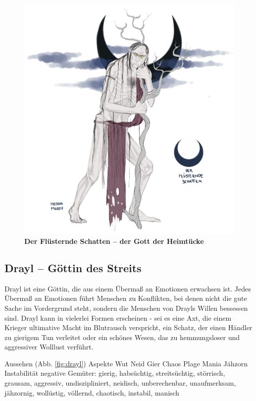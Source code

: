 \begin{figure}[tbh]
	\centering
	\includegraphics[height=0.6\textheight]{Abbildungen/Gesellschaft/Religion/fluesterer}
	\caption[Der Flüsternde Schatten -- Gott der Heimtücke]{\textbf{Der Flüsternde Schatten -- der Gott der Heimtücke}}
	\label{fig:fluesterer}
\end{figure}



\newpage
\subsection{Drayl -- Göttin des Streits}
Drayl ist eine Göttin, die aus einem Übermaß an Emotionen erwachsen ist. 
Jedes Übermaß an Emotionen führt Menschen zu Konflikten, bei denen nicht die gute Sache im Vordergrund steht, sondern die Menschen von Drayls Willen bessessen sind.
Drayl kann in vielerlei Formen erscheinen - sei es eine Axt, die einem Krieger ultimative Macht im Blutrausch verspricht, ein Schatz, der einen Händler zu gierigem Tun verleitet oder ein schönes Wesen, das zu hemmungsloser und aggressiver Wolllust verführt.

\begin{outline}
	\1 Aussehen (Abb. \ref{fig:drayl})
	\1 Aspekte
		\2 Wut
		\2 Neid
		\2 Gier
		\2 Chaos
	\1 Plage
		\2 Mania
		\2 Jähzorn
		\2 Instabilität
	\1 negative Gemüter: gierig,  habsüchtig,  streitsüchtig, störrisch, grausam, aggressiv, undiszipliniert, neidisch, unberechenbar, unaufmerksam, jähzornig, wollüstig, völlernd, 
	chaotisch, instabil, manisch
\end{outline}

